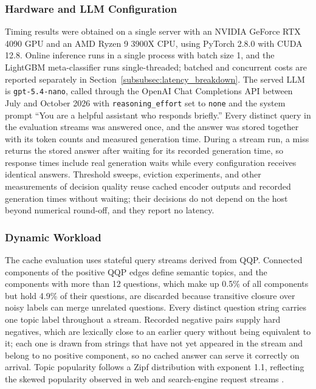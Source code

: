 \documentclass[authoryear,preprint,review,12pt]{elsarticle}
\begin{document}
\subsubsection{Hardware and LLM Configuration}
Timing results were obtained on a single server with an NVIDIA GeForce RTX 4090 GPU and an AMD Ryzen 9 3900X CPU, using PyTorch 2.8.0 with CUDA 12.8. Online inference runs in a single process with batch size 1, and the LightGBM meta-classifier runs single-threaded; batched and concurrent costs are reported separately in Section~\ref{subsubsec:latency_breakdown}. The served LLM is \texttt{gpt-5.4-nano}, called through the OpenAI Chat Completions API between July and October 2026 with \texttt{reasoning\_effort} set to \texttt{none} and the system prompt ``You are a helpful assistant who responds briefly.'' Every distinct query in the evaluation streams was answered once, and the answer was stored together with its token counts and measured generation time. During a stream run, a miss returns the stored answer after waiting for its recorded generation time, so response times include real generation waits while every configuration receives identical answers. Threshold sweeps, eviction experiments, and other measurements of decision quality reuse cached encoder outputs and recorded generation times without waiting; their decisions do not depend on the host beyond numerical round-off, and they report no latency.

\subsubsection{Dynamic Workload}
The cache evaluation uses stateful query streams derived from QQP. Connected components of the positive QQP edges define semantic topics, and the components with more than 12 questions, which make up 0.5\% of all components but hold 4.9\% of their questions, are discarded because transitive closure over noisy labels can merge unrelated questions. Every distinct question string carries one topic label throughout a stream. Recorded negative pairs supply hard negatives, which are lexically close to an earlier query without being equivalent to it; each one is drawn from strings that have not yet appeared in the stream and belong to no positive component, so no cached answer can serve it correctly on arrival. Topic popularity follows a Zipf distribution with exponent 1.1, reflecting the skewed popularity observed in web and search-engine request streams \citep{breslau1999web,xie2002locality}.
\end{document}
